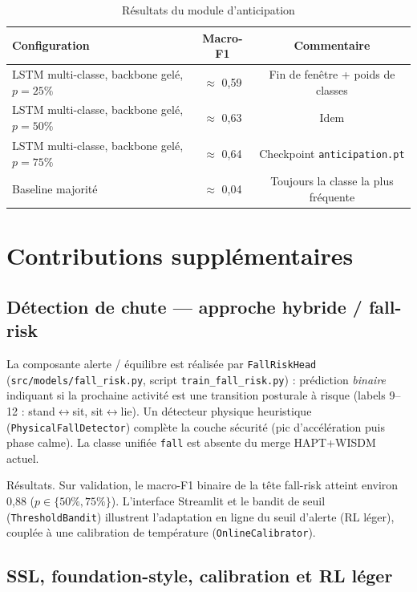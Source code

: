 \begin{table}[H]
\centering
\small
\begin{tabularx}{0.88\textwidth}{|Y|c|c|}
\hline
\textbf{Configuration} & \textbf{Macro-F1} & \textbf{Commentaire} \\
\hline
LSTM multi-classe, backbone gelé, $p=25\%$ & $\approx$ 0,59 & Fin de fenêtre + poids de classes \\
LSTM multi-classe, backbone gelé, $p=50\%$ & $\approx$ 0,63 & Idem \\
LSTM multi-classe, backbone gelé, $p=75\%$ & $\approx$ 0,64 & Checkpoint \texttt{anticipation.pt} \\
Baseline majorité & $\approx$ 0,04 & Toujours la classe la plus fréquente \\
\hline
\end{tabularx}
\caption{Résultats du module d'anticipation}
\label{tab:anticipation_impl}
\end{table}
\section{Contributions supplémentaires}

\subsection{Détection de chute — approche hybride / fall-risk}

La composante alerte / équilibre est réalisée par \texttt{FallRiskHead}
(\texttt{src/models/fall\_risk.py}, script \texttt{train\_fall\_risk.py}) :
prédiction \emph{binaire} indiquant si la prochaine activité est une transition
posturale à risque (labels 9--12 : stand$\leftrightarrow$sit, sit$\leftrightarrow$lie).
Un détecteur physique heuristique (\texttt{PhysicalFallDetector}) complète la
couche sécurité (pic d'accélération puis phase calme). La classe unifiée
\texttt{fall} est absente du merge HAPT+WISDM actuel.

Résultats. Sur validation, le macro-F1 binaire de la tête fall-risk atteint
environ 0,88 ($p\in\{50\%,75\%\}$). L'interface Streamlit et le bandit de
seuil (\texttt{ThresholdBandit}) illustrent l'adaptation en ligne du seuil
d'alerte (RL léger), couplée à une calibration de température
(\texttt{OnlineCalibrator}).

\subsection{SSL, foundation-style, calibration et RL léger}

